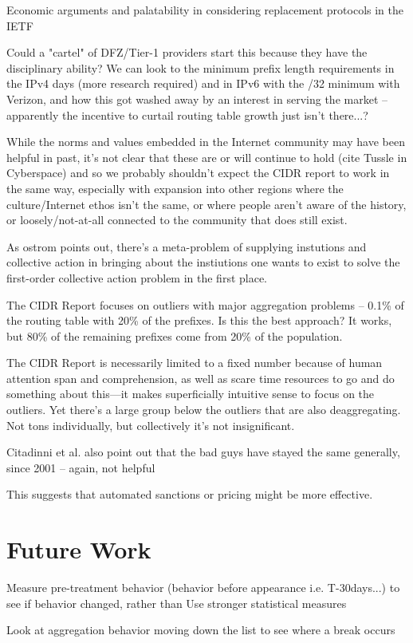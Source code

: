 Economic arguments and palatability in considering replacement protocols in the IETF

Could a "cartel" of DFZ/Tier-1 providers start this because they have the disciplinary ability? We can look to the minimum prefix length requirements in the IPv4 days (more research required) and in IPv6 with the /32 minimum with Verizon, and how this got washed away by an interest in serving the market -- apparently the incentive to curtail routing table growth just isn't there...?

While the norms and values embedded in the Internet community may have been helpful in past, it's not clear that these are or will continue to hold (cite Tussle in Cyberspace) and so we probably shouldn't expect the CIDR report to work in the same way, especially with expansion into other regions where the culture/Internet ethos isn't the same, or where people aren't aware of the history, or loosely/not-at-all connected to the community that does still exist.

As ostrom points out, there's a meta-problem of supplying instutions and collective action in bringing about the instiutions one wants to exist to solve the first-order collective action problem in the first place.

The CIDR Report focuses on outliers with major aggregation problems -- 0.1\% of the routing table with 20\% of the prefixes. Is this the best approach? It works, but 80\% of the remaining prefixes come from 20\% of the population.

The CIDR Report is necessarily limited to a fixed number because of human
attention span and comprehension, as well as scare time resources to go and do
something about this---it makes superficially intuitive sense to focus on the
outliers. Yet there's a large group below the outliers that are also
deaggregating. Not tons individually, but collectively it's not insignificant.

Citadinni et al. also point out that the bad guys have stayed the same
generally, since 2001 -- again, not helpful

This suggests that automated sanctions or pricing might be more effective.

\section{Future Work}
Measure pre-treatment behavior (behavior before appearance i.e. T-30days...) to see if behavior changed, rather than
Use stronger statistical measures

Look at aggregation behavior moving down the list to see where a break occurs
